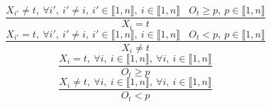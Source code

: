 $$\frac{X_{i'} \neq t,~\forall i',~i' \neq i,~i' \in \llbracket1,n\rrbracket,~i \in \llbracket1,n\rrbracket~~~~O_{t} \geq p,~p \in \llbracket1,n\rrbracket}{X_{i}=t}$$ $$\frac{X_{i'}=t,~\forall i',~i' \neq i,~i' \in \llbracket1,n\rrbracket,~i \in \llbracket1,n\rrbracket~~~~O_{t}<p,~p \in \llbracket1,n\rrbracket}{X_{i} \neq t}$$ $$\frac{X_{i}=t,~\forall i,~i \in \llbracket1,n\rrbracket,~\forall i,~i \in \llbracket1,n\rrbracket}{O_{t} \geq p}$$ $$\frac{X_{i} \neq t,~\forall i,~i \in \llbracket1,n\rrbracket,~\forall i,~i \in \llbracket1,n\rrbracket}{O_{t}<p}$$ 
